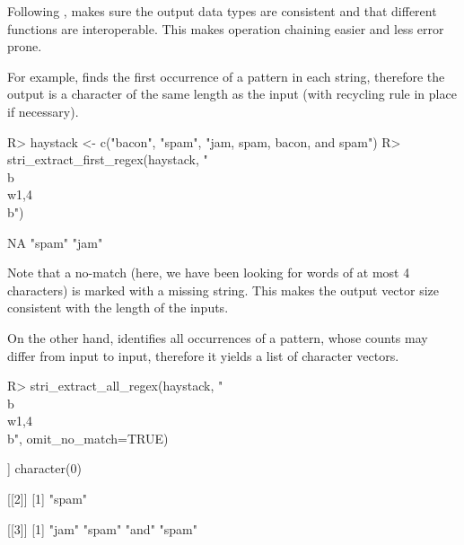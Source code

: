 \documentclass[nojss]{jss}
\begin{document}
Following \citep{Wickham2010:stringr}, 
makes sure the output data types are consistent
and that different functions are interoperable.
This makes operation chaining easier and less error prone.

For example, 
finds the first occurrence of a pattern in each string,
therefore the output is a character of the same length
as the input (with recycling rule in place if necessary).



%
%
%





\begin{Schunk}
\begin{Sinput}
R> haystack <- c("bacon", "spam", "jam, spam, bacon, and spam")
R> stri_extract_first_regex(haystack, "\\b\\w{1,4}\\b")
\end{Sinput}
\begin{Soutput}
[1] NA     "spam" "jam"
\end{Soutput}
\end{Schunk}

Note that a no-match (here, we have been looking for words
of at most 4 characters)
is marked with a missing string.
This makes the output vector size consistent with the length of
the inputs.

On the other hand, 
identifies all occurrences of a pattern, whose counts may differ from input to input,
therefore it yields a list of character vectors.

\begin{Schunk}
\begin{Sinput}
R> stri_extract_all_regex(haystack, "\\b\\w{1,4}\\b", omit_no_match=TRUE)
\end{Sinput}
\begin{Soutput}
[[1]]
character(0)

[[2]]
[1] "spam"

[[3]]
[1] "jam"  "spam" "and"  "spam"
\end{Soutput}
\end{Schunk}
\end{document}
